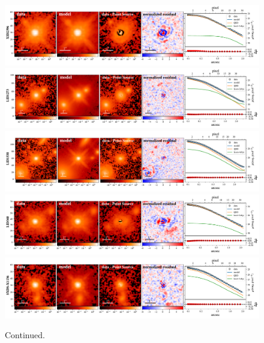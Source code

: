 \documentclass[apj]{emulateapj}
\begin{document}
\begin{figure}
\centering
{
\includegraphics[height=0.25\textwidth]{fig/best_fit_XID2396_SB_profile.pdf}
\includegraphics[height=0.25\textwidth]{fig/best_fit_LID1273_SB_profile.pdf}
\includegraphics[height=0.25\textwidth]{fig/best_fit_LID1538_SB_profile.pdf}
\includegraphics[height=0.25\textwidth]{fig/best_fit_LID360_SB_profile.pdf}
\includegraphics[height=0.25\textwidth]{fig/best_fit_SXDS-X1136_SB_profile.pdf}
}
\caption{\label{fig:ML} Continued.}
\end{figure} 
\end{document}
